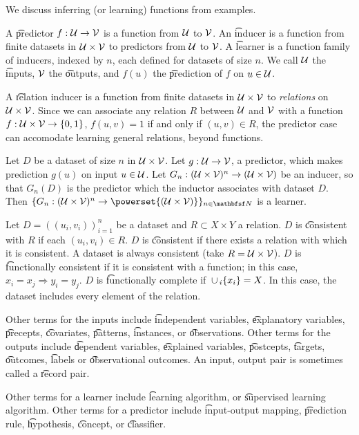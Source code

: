 
We discuss inferring (or learning) functions from examples.

A \t{predictor} $f: \mathcal{U} \to \mathcal{V}$ is a function from $\mathcal{U}$ to $\mathcal{V}$.
An \t{inducer} is a function from finite datasets in $\mathcal{U} \times  \mathcal{V}$ to predictors from $\mathcal{U}$ to $\mathcal{V}$.
A \t{learner} is a function family of inducers, indexed by $n$, each defined for datasets of size $n$.
We call $\mathcal{U}$ the \t{inputs}, $\mathcal{V}$ the \t{outputs}, and $f(u)$ the \t{prediction} of $f$ on $u \in \mathcal{U}$.

A \t{relation inducer} is a function from finite datasets in $\mathcal{U} \times  \mathcal{V}$ to \textit{relations} on $\mathcal{U} \times  \mathcal{V}$.
Since we can associate any relation $R$ between $\mathcal{U}$ and $\mathcal{V}$ with a function $f: \mathcal{U} \times  \mathcal{V} \to \{0, 1\}$, $f(u, v) = 1$ if and only if $(u, v) \in R$, the predictor case can accomodate learning general relations, beyond functions.


Let $D$ be a dataset of size $n$ in $\mathcal{U} \times \mathcal{V}$.
Let $g: \mathcal{U} \to \mathcal{V}$, a predictor, which makes prediction $g(u)$ on input $u \in \mathcal{U}$.
Let $G_n: (\mathcal{U} \times \mathcal{V})^n \to (\mathcal{U} \times  \mathcal{V})$ be an inducer, so that $G_n(D)$ is the predictor which the inductor associates with dataset $D$.
Then $\set{G_n: (\CU \times  \CV)^n \to \powerset{(\CU \times \CV)}}_{n \in \N}$ is a learner.


Let $D = ((u_i, v_i))_{i = 1}^{n}$ be a dataset and $R \subset X \times  Y$ a relation.
$D$ is \t{consistent with $R$} if each $(u_i, v_i) \in R$.
$D$ is \t{consistent} if there exists a relation with which it is consistent.
A dataset is always consistent (take $R = \mathcal{U} \times  \mathcal{V}$).
$D$ is \t{functionally consistent} if it is consistent with a function; in this case, $x_i = x_j \Rightarrow y_i = y_j$.
$D$ is \t{functionally complete} if $\,\cup\,_i\{x_i\} = X$.
In this case, the dataset includes every element of the relation.


Other terms for the inputs include \t{independent variables}, \t{explanatory variables}, \t{precepts}, \t{covariates}, \t{patterns}, \t{instances}, or \t{observations}.
Other terms for the outputs include \t{dependent variables}, \t{explained variables}, \t{postcepts}, \t{targets}, \t{outcomes}, \t{labels} or \t{observational outcomes}.
An input, output pair is sometimes called a \t{record pair}.

Other terms for a learner include \t{learning algorithm}, or \t{supervised learning algorithm}.
Other terms for a predictor include \t{input-output} mapping, \t{prediction rule}, \t{hypothesis}, \t{concept}, or \t{classifier}.
